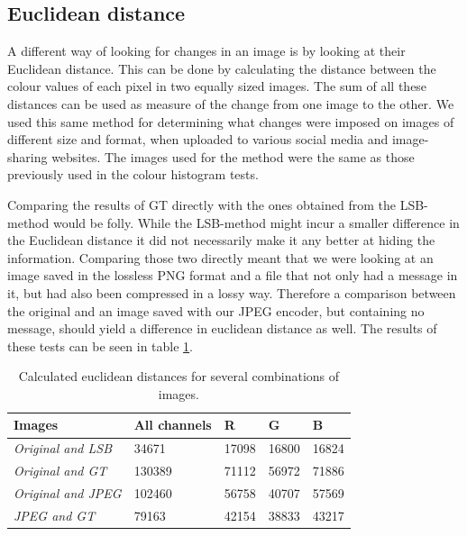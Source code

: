 \subsection{Euclidean distance}
A different way of looking for changes in an image is by looking at their Euclidean distance.
This can be done by calculating the distance between the colour values of each pixel in two equally sized images.
The sum of all these distances can be used as measure of the change from one image to the other.
We used this same method for determining what changes were imposed on images of different size and format, when uploaded to various social media and image-sharing websites.
The images used for the method were the same as those previously used in the colour histogram tests.

Comparing the results of GT directly with the ones obtained from the LSB-method would be folly.
While the LSB-method might incur a smaller difference in the Euclidean distance it did not necessarily make it any better at hiding the information.
Comparing those two directly meant that we were looking at an image saved in the lossless PNG format and a file that not only had a message in it, but had also been compressed in a lossy way.
Therefore a comparison between the original and an image saved with our JPEG encoder, but containing no message, should yield a difference in euclidean distance as well.
The results of these tests can be seen in table \ref {fig:euclidean_distance}.

\begin{table}[]
	\centering
	\begin{tabular}{@{}lllll@{}}
		\toprule
		\textbf{Images}            & \textbf{All channels} & \textbf{R} & \textbf{G} & \textbf{B} \\ \midrule
		\textit{Original and LSB}  & 34671                 & 17098      & 16800      & 16824      \\
		\textit{Original and GT}   & 130389                & 71112      & 56972      & 71886      \\
		\textit{Original and JPEG} & 102460                & 56758      & 40707      & 57569      \\
		\textit{JPEG and GT}       & 79163                 & 42154      & 38833      & 43217     
	\end{tabular}
	\caption{Calculated euclidean distances for several combinations of images.}
	\label{fig:euclidean_distance}
\end{table}

